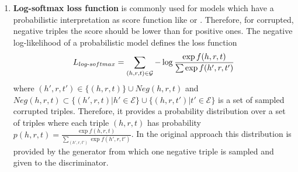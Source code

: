 \begin{enumerate}
    
    \item 
    \textbf{Log-softmax loss function} is commonly used for models which have a probabilistic interpretation as score function like \distmult or \complex.
    Therefore, for corrupted, negative triples the score should be lower than for positive ones.
    The negative log-likelihood of a probabilistic model defines the loss function \cite{cai2017kbgan}
    \begin{equation} \label{eq:nllloss}
        L_{log\text{-}softmax}=\sum_{(h,r,t)\in\mathcal{G}}-\log \frac{\exp f(h,r,t)}{\sum\exp f(h',r,t')}
    \end{equation}
    where $(h',r,t')\in\{(h,r,t)\}\cup Neg(h,r,t)$ and $Neg(h,r,t)\subset\{(h',r,t)|h'\in\mathcal{E}\}\cup\{(h,r,t')|t'\in\mathcal{E}\}$ is a set of sampled corrupted triples.
    Therefore, it provides a probability distribution over a set of triples where each triple $(h, r, t)$ has probability $p(h,r,t)=\frac{\exp f(h,r,t)}{\sum_{(h',r,t')}\exp f(h',r,t')}$.
    In the original \kbgan approach this distribution is provided by the generator from which one negative triple is sampled and given to the discriminator.
\end{enumerate}


